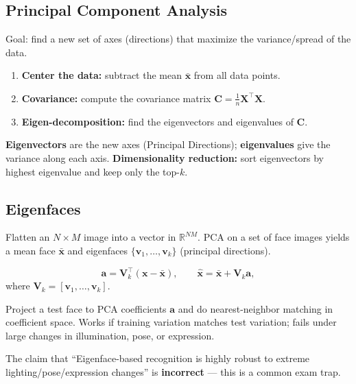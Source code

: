 \documentclass[11pt, oneside]{book}
\newcommand{\R}{\mathbb{R}}
\newcommand{\vct}[1]{\bm{#1}}           %
\newcommand{\mat}[1]{\mathbf{#1}}       %
\begin{document}
\begin{thmbox}[title={Reprojection Error Minimization}]
\begin{defbox}[title={Correlation and Convolution}]
\subsection{Principal Component Analysis}

\begin{thmbox}[title={PCA Recipe}]
Goal: find a new set of axes (directions) that maximize the variance/spread of the data.
\begin{enumerate}
  \item \textbf{Center the data:} subtract the mean $\bar{\vct{x}}$ from all data points.
  \item \textbf{Covariance:} compute the covariance matrix $\mat{C} = \frac{1}{n}\mat{X}^\top\mat{X}$.
  \item \textbf{Eigen-decomposition:} find the eigenvectors and eigenvalues of $\mat{C}$.
\end{enumerate}
\textbf{Eigenvectors} are the new axes (Principal Directions); \textbf{eigenvalues} give the variance along each axis.
\textbf{Dimensionality reduction:} sort eigenvectors by highest eigenvalue and keep only the top-$k$.
\end{thmbox}

\subsection{Eigenfaces}

Flatten an $N\times M$ image into a vector in $\R^{NM}$. PCA on a set of face images yields a mean face
$\bar{\vct{x}}$ and eigenfaces $\{\vct{v}_1,\dots,\vct{v}_k\}$ (principal directions).

\begin{thmbox}[title={Projection and Reconstruction}]
\[
\vct{a} = \mat{V}_k^\top (\vct{x}-\bar{\vct{x}}),
\qquad
\hat{\vct{x}} = \bar{\vct{x}} + \mat{V}_k \vct{a},
\]
where $\mat{V}_k=[\vct{v}_1,\dots,\vct{v}_k]$.
\end{thmbox}

\begin{exbox}[title={Recognition via Eigenfaces}]
Project a test face to PCA coefficients $\vct{a}$ and do nearest-neighbor matching in coefficient space.
Works if training variation matches test variation; fails under large changes in illumination, pose, or expression.
\end{exbox}

The claim that ``Eigenface-based recognition is highly robust to extreme lighting/pose/expression changes''
is \textbf{incorrect} --- this is a common exam trap.


\end{defbox}
\end{thmbox}
\end{document}
